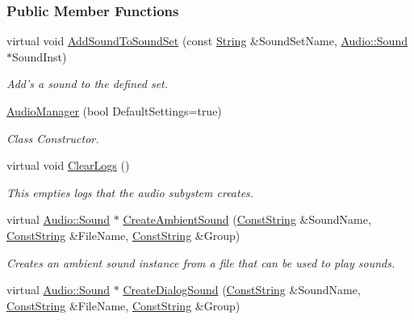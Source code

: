 \subsubsection*{Public Member Functions}
\begin{DoxyCompactItemize}
\item 
virtual void \hyperlink{classMezzanine_1_1AudioManager_a8db9deed28afb7b07017cb6fd99b624a}{AddSoundToSoundSet} (const \hyperlink{namespaceMezzanine_acf9fcc130e6ebf08e3d8491aebcf1c86}{String} \&SoundSetName, \hyperlink{classMezzanine_1_1Audio_1_1Sound}{Audio::Sound} $\ast$SoundInst)
\begin{DoxyCompactList}\small\item\em Add's a sound to the defined set. \item\end{DoxyCompactList}\item 
\hyperlink{classMezzanine_1_1AudioManager_a30da8ac656fdacf5c420f03304f4e109}{AudioManager} (bool DefaultSettings=true)
\begin{DoxyCompactList}\small\item\em Class Constructor. \item\end{DoxyCompactList}\item 
virtual void \hyperlink{classMezzanine_1_1AudioManager_a4452ecf4eabfae18e0f6651e35530579}{ClearLogs} ()
\begin{DoxyCompactList}\small\item\em This empties logs that the audio subystem creates. \item\end{DoxyCompactList}\item 
virtual \hyperlink{classMezzanine_1_1Audio_1_1Sound}{Audio::Sound} $\ast$ \hyperlink{classMezzanine_1_1AudioManager_aadb6ab0fd58253567da61c8b3432b104}{CreateAmbientSound} (\hyperlink{namespaceMezzanine_a63cd699ac54b73953f35ec9cfc05e506}{ConstString} \&SoundName, \hyperlink{namespaceMezzanine_a63cd699ac54b73953f35ec9cfc05e506}{ConstString} \&FileName, \hyperlink{namespaceMezzanine_a63cd699ac54b73953f35ec9cfc05e506}{ConstString} \&Group)
\begin{DoxyCompactList}\small\item\em Creates an ambient sound instance from a file that can be used to play sounds. \item\end{DoxyCompactList}\item 
virtual \hyperlink{classMezzanine_1_1Audio_1_1Sound}{Audio::Sound} $\ast$ \hyperlink{classMezzanine_1_1AudioManager_ada9827e181e8c8cfc31d290ccb9f6c46}{CreateDialogSound} (\hyperlink{namespaceMezzanine_a63cd699ac54b73953f35ec9cfc05e506}{ConstString} \&SoundName, \hyperlink{namespaceMezzanine_a63cd699ac54b73953f35ec9cfc05e506}{ConstString} \&FileName, \hyperlink{namespaceMezzanine_a63cd699ac54b73953f35ec9cfc05e506}{ConstString} \&Group)

\end{DoxyCompactItemize}
